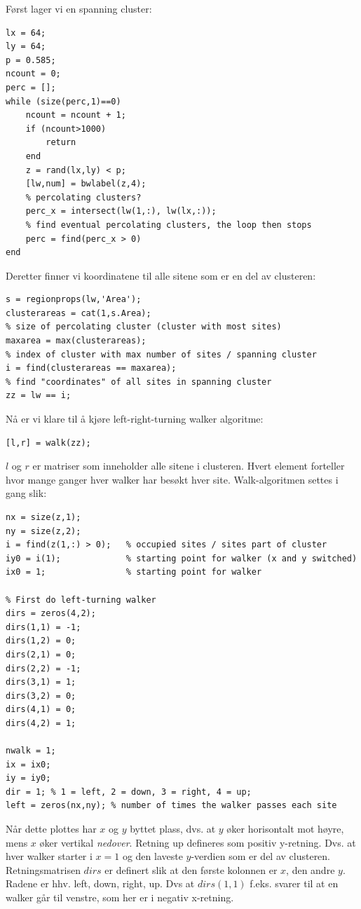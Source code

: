 \documentclass[english, a4paper]{article}
\begin{document}
\noindent
Først lager vi en spanning cluster:
\begin{lstlisting}
lx = 64;
ly = 64;
p = 0.585;
ncount = 0;
perc = [];
while (size(perc,1)==0)
    ncount = ncount + 1;
    if (ncount>1000)
        return
    end
    z = rand(lx,ly) < p;
    [lw,num] = bwlabel(z,4);
    % percolating clusters?
    perc_x = intersect(lw(1,:), lw(lx,:));
    % find eventual percolating clusters, the loop then stops
    perc = find(perc_x > 0)
end
\end{lstlisting}
Deretter finner vi koordinatene til alle sitene som er en del av clusteren:
\begin{lstlisting}
s = regionprops(lw,'Area');
clusterareas = cat(1,s.Area);
% size of percolating cluster (cluster with most sites)
maxarea = max(clusterareas);
% index of cluster with max number of sites / spanning cluster
i = find(clusterareas == maxarea);
% find "coordinates" of all sites in spanning cluster
zz = lw == i;
\end{lstlisting}
Nå er vi klare til å kjøre left-right-turning walker algoritme:
\begin{lstlisting}
[l,r] = walk(zz);
\end{lstlisting}
$l$ og $r$ er matriser som inneholder alle sitene i clusteren. Hvert element forteller hvor mange ganger
hver walker har besøkt hver site. Walk-algoritmen settes i gang slik:
\begin{lstlisting}
nx = size(z,1);
ny = size(z,2);
i = find(z(1,:) > 0);   % occupied sites / sites part of cluster
iy0 = i(1);             % starting point for walker (x and y switched)
ix0 = 1;                % starting point for walker

% First do left-turning walker
dirs = zeros(4,2);
dirs(1,1) = -1;
dirs(1,2) = 0;
dirs(2,1) = 0;
dirs(2,2) = -1;
dirs(3,1) = 1;
dirs(3,2) = 0;
dirs(4,1) = 0;
dirs(4,2) = 1;

nwalk = 1;
ix = ix0;
iy = iy0;
dir = 1; % 1 = left, 2 = down, 3 = right, 4 = up;
left = zeros(nx,ny); % number of times the walker passes each site
\end{lstlisting}
Når dette plottes har $x$ og $y$ byttet plass, dvs. at $y$ øker horisontalt mot høyre, mens $x$
øker vertikal \textit{nedover}. Retning up defineres som positiv y-retning. Dvs. at hver walker
starter i $x=1$ og den laveste $y$-verdien som er del av clusteren. Retningsmatrisen $dirs$ er
definert slik at den første kolonnen er $x$, den andre $y$. Radene er hhv. left, down, right, up. 
Dvs at $dirs(1,1)$ f.eks. svarer til at en walker går til venstre, som her er i negativ x-retning. 
\end{document}
